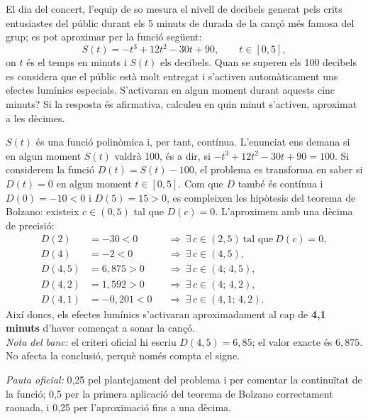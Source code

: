\begin{apartats}
El dia del concert, l'equip de so mesura el nivell de decibels generat pels crits entusiastes
del públic durant els 5 minuts de durada de la cançó més famosa del grup; es pot aproximar
per la funció següent:
\[
S(t)=-t^3+12t^2-30t+90,\qquad t\in[0,5],
\]
on $t$ és el temps en minuts i $S(t)$ els decibels. Quan se superen els 100 decibels es
considera que el públic està molt entregat i s'activen automàticament uns efectes lumínics
especials. S'activaran en algun moment durant aquests cinc minuts? Si la resposta és
afirmativa, calculeu en quin minut s'activen, aproximat a les dècimes.

\begin{solucio}
$S(t)$ és una funció polinòmica i, per tant, contínua. L'enunciat ens demana si en algun
moment $S(t)$ valdrà 100, és a dir, si $-t^3+12t^2-30t+90=100$. Si considerem la funció
$D(t)=S(t)-100$, el problema es transforma en saber si $D(t)=0$ en algun moment
$t\in[0,5]$. Com que $D$ també és contínua i $D(0)=-10<0$ i $D(5)=15>0$, es compleixen les
hipòtesis del teorema de Bolzano: existeix $c\in(0,5)$ tal que $D(c)=0$. L'aproximem amb una
dècima de precisió:
\begin{align*}
D(2)&=-30<0 &&\Rightarrow\ \exists\,c\in(2,5)\ \text{tal que}\ D(c)=0,\\
D(4)&=-2<0 &&\Rightarrow\ \exists\,c\in(4,5),\\
D(4{,}5)&=6{,}875>0 &&\Rightarrow\ \exists\,c\in(4;\,4{,}5),\\
D(4{,}2)&=1{,}592>0 &&\Rightarrow\ \exists\,c\in(4;\,4{,}2),\\
D(4{,}1)&=-0{,}201<0 &&\Rightarrow\ \exists\,c\in(4{,}1;\,4{,}2).
\end{align*}
Així doncs, els efectes lumínics s'activaran aproximadament al cap de \textbf{4,1 minuts}
d'haver començat a sonar la cançó.\\
\textit{Nota del banc:} el criteri oficial hi escriu $D(4{,}5)=6{,}85$; el valor exacte és
$6{,}875$. No afecta la conclusió, perquè només compta el signe.

\textit{Pauta oficial:} 0,25 pel plantejament del problema i per comentar la continuïtat de
la funció; 0,5 per la primera aplicació del teorema de Bolzano correctament raonada, i 0,25
per l'aproximació fins a una dècima.
\end{solucio}

\end{apartats}
